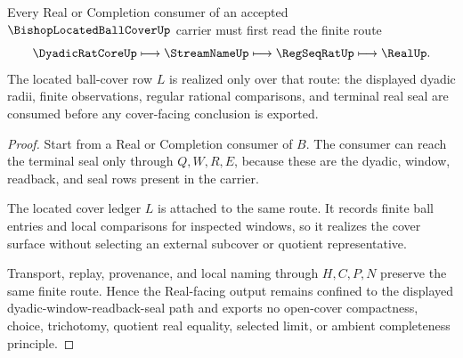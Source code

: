 \begin{theorem}
\label{thm:bishop-located-ball-cover-finite-window-realizer}
Every Real or Completion consumer of an accepted $\BishopLocatedBallCoverUp$ carrier must first read the finite route
$$
\DyadicRatCoreUp \longmapsto \StreamNameUp \longmapsto \RegSeqRatUp \longmapsto \RealUp .
$$
The located ball-cover row $L$ is realized only over that route: the displayed dyadic radii, finite observations, regular rational comparisons, and terminal real seal are consumed before any cover-facing conclusion is exported.
\end{theorem}
\begin{proof}
Start from a Real or Completion consumer of $B$. The consumer can reach the terminal seal only through $Q,W,R,E$, because these are the dyadic, window, readback, and seal rows present in the carrier.

The located cover ledger $L$ is attached to the same route. It records finite ball entries and local comparisons for inspected windows, so it realizes the cover surface without selecting an external subcover or quotient representative.

Transport, replay, provenance, and local naming through $H,C,P,N$ preserve the same finite route. Hence the Real-facing output remains confined to the displayed dyadic-window-readback-seal path and exports no open-cover compactness, choice, trichotomy, quotient real equality, selected limit, or ambient completeness principle.
\end{proof}




